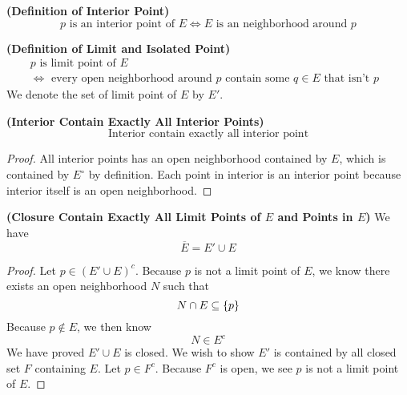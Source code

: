 \documentclass{report}
\begin{document}
\begin{definition}
\label{2.2.4}
\textbf{(Definition of Interior Point)} 
\begin{equation}
\text{ $p$ is an interior point of }E\iff E \text{ is an neighborhood around  $p$ }
\end{equation}
\end{definition}
\begin{definition}
\label{2.2.5}
\textbf{(Definition of Limit and Isolated Point)} 
\begin{gather}
p\text{ is limit point of $E$ }\\
\iff \text{ every open neighborhood around $p$ contain some $q\in E$ that isn't $p$ }
\end{gather}
We denote the set of limit point of $E$ by  $E'$. 
\end{definition}
\begin{theorem}
\label{2.2.6}
\textbf{(Interior Contain Exactly All Interior Points)} 
\begin{equation}
\text{ Interior contain exactly all interior point }
\end{equation}
\end{theorem}
\begin{proof}
All interior points has an open neighborhood contained by $E$, which is contained by  $E^\circ $ by definition. Each point in interior is an interior point because interior itself is an open neighborhood.
\end{proof}
\begin{theorem}
\label{2.2.7}
\textbf{(Closure Contain Exactly All Limit Points of $E$ and Points in $E$)} We have
\begin{equation}
\overline{E}= E' \cup  E
\end{equation}
\end{theorem}
\begin{proof}
Let $p\in (E'\cup E)^c$. Because $p$ is not a limit point of  $E$, we know there exists an open neighborhood $N$ such that
 \begin{equation*}
N\cap E\subseteq \{ p \}
\end{equation*}
Because $p\not\in E$, we then know
\begin{equation*}
N\in E^c
\end{equation*}
We have proved $E'\cup E$ is closed. We wish to show  $E'$ is contained by all closed set $F$ containing  $E$. Let $p\in F^c$. Because $F^c$ is open, we see  $p$ is not a limit point of  $E$.  
\end{proof}
\end{document}
